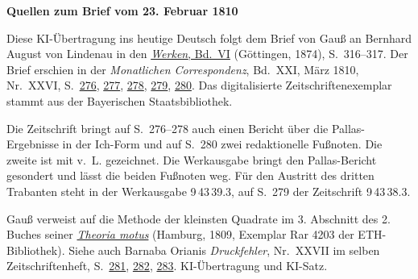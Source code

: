 \clearpage\thispagestyle{empty}
\begin{center}\textbf{Quellen zum Brief vom 23. Februar 1810}\end{center}
\noindent Diese KI-Übertragung ins heutige Deutsch folgt dem Brief von Gauß an Bernhard August von Lindenau in den \href{https://gdz.sub.uni-goettingen.de/id/PPN236007467}{\textit{Werken}, Bd.~VI} (Göttingen, 1874), S.~316--317. Der Brief erschien in der \textit{Monatlichen Correspondenz}, Bd.~XXI, März 1810, Nr.~XXVI, S.~\href{https://api.digitale-sammlungen.de/iiif/image/v2/bsb10538611_00284/full/1600,/0/default.jpg}{276}, \href{https://api.digitale-sammlungen.de/iiif/image/v2/bsb10538611_00285/full/1600,/0/default.jpg}{277}, \href{https://api.digitale-sammlungen.de/iiif/image/v2/bsb10538611_00286/full/1600,/0/default.jpg}{278}, \href{https://api.digitale-sammlungen.de/iiif/image/v2/bsb10538611_00287/full/1600,/0/default.jpg}{279}, \href{https://api.digitale-sammlungen.de/iiif/image/v2/bsb10538611_00288/full/1600,/0/default.jpg}{280}. Das digitalisierte Zeitschriftenexemplar stammt aus der Bayerischen Staatsbibliothek.
\par\smallskip\noindent Die Zeitschrift bringt auf S.~276--278 auch einen Bericht über die Pallas-Ergebnisse in der Ich-Form und auf S.~280 zwei redaktionelle Fußnoten. Die zweite ist mit v.~L. gezeichnet. Die Werkausgabe bringt den Pallas-Bericht gesondert und lässt die beiden Fußnoten weg. Für den Austritt des dritten Trabanten steht in der Werkausgabe 9\,43\,39.3, auf S.~279 der Zeitschrift 9\,43\,38.3.
\par\smallskip\noindent Gauß verweist auf die Methode der kleinsten Quadrate im 3. Abschnitt des 2. Buches seiner \href{https://www.e-rara.ch/zut/doi/10.3931/e-rara-522?lang=en}{\textit{Theoria motus}} (Hamburg, 1809, Exemplar Rar 4203 der ETH-Bibliothek). Siehe auch Barnaba Orianis \textit{Druckfehler}, Nr.~XXVII im selben Zeitschriftenheft, S.~\href{https://api.digitale-sammlungen.de/iiif/image/v2/bsb10538611_00289/full/1600,/0/default.jpg}{281}, \href{https://api.digitale-sammlungen.de/iiif/image/v2/bsb10538611_00290/full/1600,/0/default.jpg}{282}, \href{https://api.digitale-sammlungen.de/iiif/image/v2/bsb10538611_00291/full/1600,/0/default.jpg}{283}. KI-Übertragung und KI-Satz.
\clearpage
